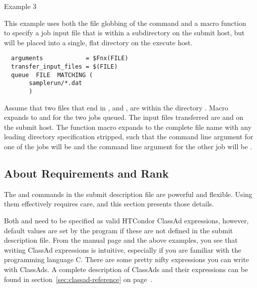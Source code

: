 \begin{description}
\item[Example 3]
\end{description}
This example uses both the file globbing of the 
command and a macro function to specify a job input file that is
within a subdirectory on the submit host,
but will be placed into a single, flat directory on the execute host.
\begin{verbatim}
  arguments            = $Fnx(FILE)
  transfer_input_files = $(FILE)
  queue  FILE  MATCHING (
       samplerun/*.dat
       )
\end{verbatim}
Assume that two files that end in ,  and ,
are within the directory .
Macro  expands to  and 
for the two jobs queued.
The input files transferred are 
 and 
on the submit host.
The  function macro expands to the complete file name
with any leading directory specification stripped,
such that the command line argument for one of the
jobs will be  and the command line argument for the
other job will be .

\subsection{\label{sec:user-man-req-and-rank}About Requirements and Rank}

The 
 and  commands in the submit description file
are powerful and flexible. 
Using them effectively requires care, and this section presents
those details.

Both  and  need to be specified 
as valid HTCondor ClassAd expressions, however, default values are set by the
 program if these are not defined in the submit description file.
From the  manual page and the above examples, you see
that writing ClassAd expressions is intuitive, especially if you
are familiar with the programming language C.  There are some
pretty nifty expressions you can write with ClassAds.
A complete description of ClassAds and their expressions
can be found in section~\ref{sec:classad-reference} on 
page~\pageref{sec:classad-reference}.

